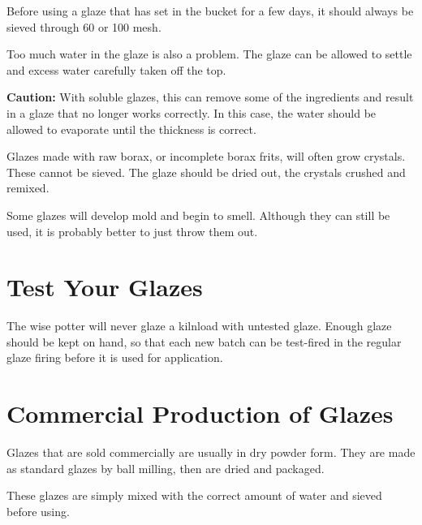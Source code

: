 Before using a glaze that has set in the bucket for a few days, it should 
always be sieved through 60 or 100 mesh.

Too much water in the glaze is also a problem. The glaze can be allowed to 
settle and excess water carefully taken off the top. 

\textbf{Caution:} With soluble glazes, this can remove some of the ingredients 
and result in a glaze that no longer works correctly. In this case, the water 
should be allowed to evaporate until the thickness is correct.

Glazes made with raw borax, or incomplete borax frits, will often grow 
crystals. These cannot be sieved. The glaze should be dried out, the crystals 
crushed and remixed.

Some glazes will develop mold and begin to smell. Although they can still be 
used, it is probably better to just throw them out.
\section{Test Your Glazes}
The wise potter will never glaze a kilnload with untested glaze. Enough glaze 
should be kept on hand, so that each new batch can be test-fired in the regular 
glaze firing before it is used for application.
\section{Commercial Production of Glazes}
Glazes that are sold commercially are usually in dry powder form. They are made 
as standard glazes by ball milling, then are dried and packaged.

These glazes are simply mixed with the correct amount of water and sieved 
before using.
